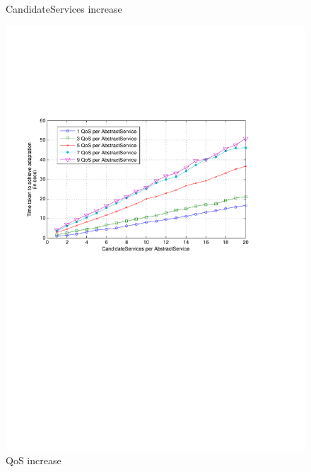 \documentclass[10pt,journal,compsoc]{IEEEtran}
\begin{document}
\begin{figure}[htbp]
\begin{minipage}[b]{0.4\linewidth}
		\caption{CandidateServices increase \label{fig:svc_per_qos}}
	\end{minipage}
	\hspace{0.9cm}
	\begin{minipage}[b]{0.4\linewidth}
			\vspace{0.3cm}
		\includegraphics[clip, trim=2cm 14cm 2cm 6cm, scale=0.3]{graphs/1_3_5_7_9_qos_per_svc_scaling.pdf}
		\caption{QoS increase \label{fig:qos_per_svc}}
	\end{minipage}
\end{figure}
\end{document}
